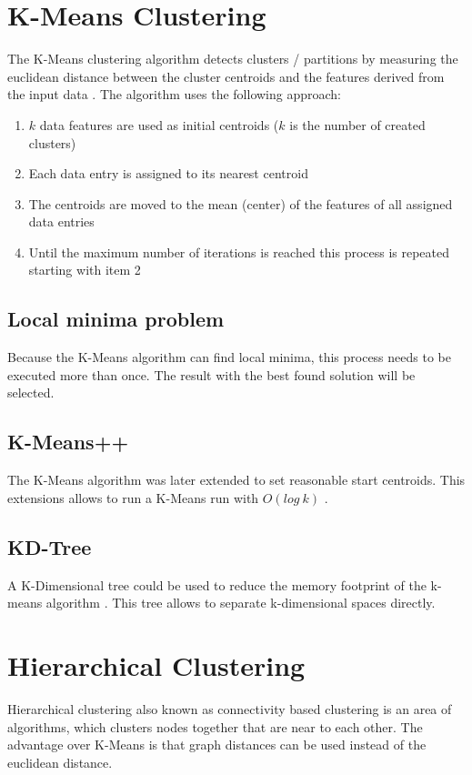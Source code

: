 \section{K-Means Clustering}
\label{sec:K-Means}
The K-Means clustering algorithm detects clusters / partitions by measuring the euclidean distance between the cluster centroids and the features derived from the input data \cite{k-means++:2007}. The algorithm uses the following approach:

\begin{enumerate}
    \item $k$ data features are used as initial centroids ($k$ is the number of created clusters)
    \item Each data entry is assigned to its nearest centroid
    \item The centroids are moved to the mean (center) of the features of all assigned data entries
    \item Until the maximum number of iterations is reached this process is repeated starting with item 2
\end{enumerate}

\subsection{Local minima problem}
Because the K-Means algorithm can find local minima, this process needs to be executed more than once. The result with the best found solution will be selected.

\subsection{K-Means++} \label{sec:k-means++}
The K-Means algorithm was later extended to set reasonable start centroids. This extensions allows to run a K-Means run with $O(log\ k)$ \cite{k-means++:2007}.

\subsection{KD-Tree} \label{sec:k-means_KD-tree}
A K-Dimensional tree could be used to reduce the memory footprint of the k-means algorithm \citep{kmeans:2002}. This tree allows to separate k-dimensional spaces directly.

\pagebreak
\FloatBarrier
\section{Hierarchical Clustering} 
\label{sec:hierarchicalClustering}
Hierarchical clustering also known as connectivity based clustering is an area of algorithms, which clusters nodes together that are near to each other. The advantage over K-Means is that graph distances can be used instead of the euclidean distance.

